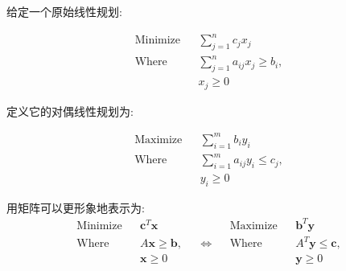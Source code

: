 给定一个原始线性规划:

$$
\begin{aligned}
\text{Minimize}&&\sum_{j=1}^n c_j x_j\\
\text{Where}&&\sum_{j=1}^n a_{ij} x_j\ge b_i,\\
&&x_j\ge 0
\end{aligned}
$$

定义它的对偶线性规划为:

$$
\begin{aligned}
\text{Maximize}&&\sum_{i=1}^m b_i y_i\\
\text{Where}&&\sum_{i=1}^m a_{ij} y_i\le c_j,\\
&&y_i\ge 0
\end{aligned}
$$

用矩阵可以更形象地表示为:
$$
\begin{aligned}
\text{Minimize}&& \mathbf c^T \mathbf x &&&& \text{Maximize} && \mathbf b^{T}\mathbf y\\
\text{Where}&& A\mathbf x \ge \mathbf b, && \Longleftrightarrow && \text{Where} && A^T\mathbf y \le \mathbf c,\\
&& \mathbf x\ge 0 &&&&&& \mathbf y\ge 0
\end{aligned}
$$
